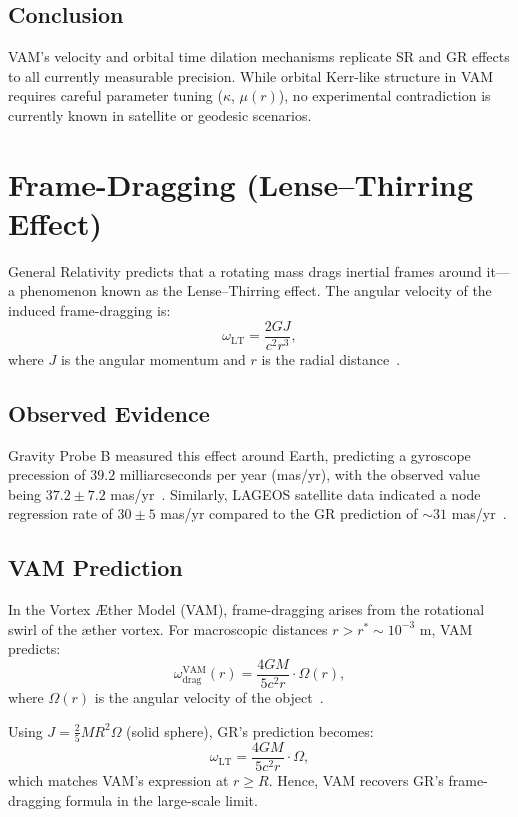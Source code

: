 \documentclass[a4paper, aps,preprint,superscriptaddress, 12pt]{revtex4}
\begin{document}
\subsection*{Conclusion}

VAM's velocity and orbital time dilation mechanisms replicate SR and GR effects to all currently measurable precision. While orbital Kerr-like structure in VAM requires careful parameter tuning ($\kappa$, $\mu(r)$), no experimental contradiction is currently known in satellite or geodesic scenarios.
\section{Frame-Dragging (Lense--Thirring Effect)}

General Relativity predicts that a rotating mass drags inertial frames around it—a phenomenon known as the Lense--Thirring effect. The angular velocity of the induced frame-dragging is:
\[
    \omega_\text{LT} = \frac{2GJ}{c^2 r^3},
\]
where $J$ is the angular momentum and $r$ is the radial distance~\cite{ciufolini2004confirmation}.

\subsection*{Observed Evidence}
Gravity Probe B measured this effect around Earth, predicting a gyroscope precession of $39.2$ milliarcseconds per year (mas/yr), with the observed value being $37.2 \pm 7.2$ mas/yr~\cite{everitt2011gravity}. Similarly, LAGEOS satellite data indicated a node regression rate of $30 \pm 5$ mas/yr compared to the GR prediction of $\sim31$ mas/yr~\cite{ciufolini2004confirmation}.

\subsection*{VAM Prediction}
In the Vortex Æther Model (VAM), frame-dragging arises from the rotational swirl of the æther vortex. For macroscopic distances $r > r^* \sim 10^{-3}$ m, VAM predicts:
\[
    \omega^\text{VAM}_\text{drag}(r) = \frac{4GM}{5c^2 r} \cdot \Omega(r),
\]
where $\Omega(r)$ is the angular velocity of the object~\cite{iskandarani2025VAM2}.

Using $J = \frac{2}{5}MR^2\Omega$ (solid sphere), GR's prediction becomes:
\[
    \omega_\text{LT} = \frac{4GM}{5c^2 r} \cdot \Omega,
\]
which matches VAM's expression at $r \ge R$. Hence, VAM recovers GR's frame-dragging formula in the large-scale limit.
\end{document}
